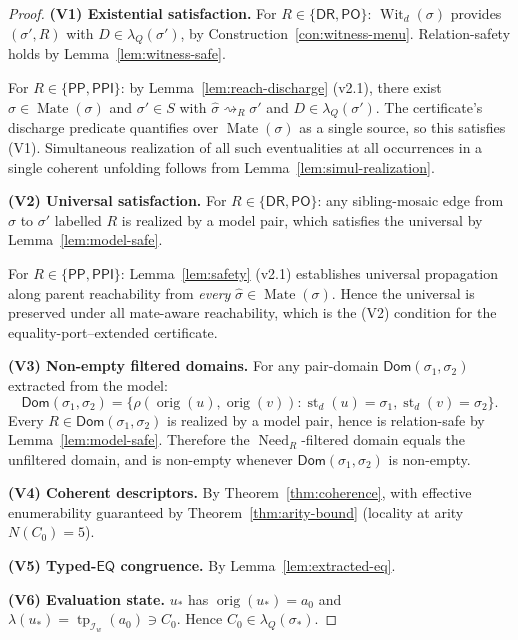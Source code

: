 \documentclass[11pt]{article}
\theoremstyle{definition}
\theoremstyle{remark}
\newcommand{\DR}{\mathsf{DR}}
\newcommand{\PO}{\mathsf{PO}}
\newcommand{\PP}{\mathsf{PP}}
\newcommand{\PPI}{\mathsf{PPI}}
\newcommand{\EQ}{\mathsf{EQ}}
\newcommand{\tp}{\operatorname{tp}}
\newcommand{\st}{\operatorname{st}}
\newcommand{\orig}{\operatorname{orig}}
\newcommand{\Need}{\operatorname{Need}}
\newcommand{\Wit}{\operatorname{Wit}}
\newcommand{\Dom}{\mathsf{Dom}}
\newcommand{\Mate}{\operatorname{Mate}}
\newcommand{\reach}{\rightsquigarrow}
\begin{document}
\begin{proof}

\noindent\textbf{(V1) Existential satisfaction.}\;
For $R \in \{\DR,\PO\}$: $\Wit_d(\sigma)$ provides
$(\sigma', R)$ with $D \in \lambda_Q(\sigma')$, by
Construction~\ref{con:witness-menu}.  Relation-safety holds by
Lemma~\ref{lem:witness-safe}.

For $R \in \{\PP, \PPI\}$: by Lemma~\ref{lem:reach-discharge}
(v2.1), there exist $\widehat{\sigma}\in\Mate(\sigma)$ and
$\sigma'\in S$ with $\widehat{\sigma}\reach_R\sigma'$ and
$D\in\lambda_Q(\sigma')$.  The certificate's discharge predicate
quantifies over $\Mate(\sigma)$ as a single source, so this
satisfies (V1).  Simultaneous realization of all such
eventualities at all occurrences in a single coherent unfolding
follows from Lemma~\ref{lem:simul-realization}.

\noindent\textbf{(V2) Universal satisfaction.}\;
For $R \in \{\DR,\PO\}$: any sibling-mosaic edge from $\sigma$ to
$\sigma'$ labelled $R$ is realized by a model pair, which
satisfies the universal by Lemma~\ref{lem:model-safe}.

For $R \in \{\PP,\PPI\}$: Lemma~\ref{lem:safety} (v2.1)
establishes universal propagation along parent reachability from
\emph{every} $\widehat{\sigma}\in\Mate(\sigma)$.  Hence the
universal is preserved under all mate-aware reachability, which is
the (V2) condition for the equality-port–extended certificate.

\noindent\textbf{(V3) Non-empty filtered domains.}\;
For any pair-domain $\Dom(\sigma_1, \sigma_2)$ extracted from the
model:
\[
\Dom(\sigma_1,\sigma_2) = \{\rho(\orig(u),\orig(v)) : \st_d(u) =
\sigma_1, \st_d(v) = \sigma_2\}.
\]
Every $R \in \Dom(\sigma_1,\sigma_2)$ is realized by a model
pair, hence is relation-safe by Lemma~\ref{lem:model-safe}.
Therefore the $\Need_R$-filtered domain equals the unfiltered
domain, and is non-empty whenever $\Dom(\sigma_1,\sigma_2)$ is
non-empty.

\noindent\textbf{(V4) Coherent descriptors.}\;
By Theorem~\ref{thm:coherence}, with effective enumerability
guaranteed by Theorem~\ref{thm:arity-bound} (locality at arity
$N(C_0)=5$).

\noindent\textbf{(V5) Typed-$\EQ$ congruence.}\;
By Lemma~\ref{lem:extracted-eq}.

\noindent\textbf{(V6) Evaluation state.}\;
$u_\ast$ has $\orig(u_\ast) = a_0$ and $\lambda(u_\ast) =
\tp_{\mathcal{I}_w}(a_0) \ni C_0$.  Hence $C_0 \in
\lambda_Q(\sigma_\ast)$.
\end{proof}
\end{document}

